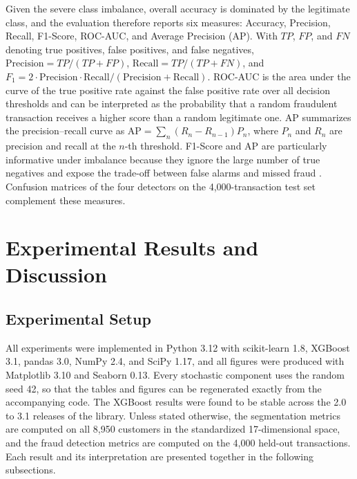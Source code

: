 \documentclass[conference]{IEEEtran}
\begin{document}
Given the severe class imbalance, overall accuracy is dominated by the legitimate class, and the evaluation therefore reports six measures: Accuracy, Precision, Recall, F1-Score, ROC-AUC, and Average Precision (AP). With $TP$, $FP$, and $FN$ denoting true positives, false positives, and false negatives, $\mathrm{Precision}=TP/(TP+FP)$, $\mathrm{Recall}=TP/(TP+FN)$, and $F_1=2\cdot\mathrm{Precision}\cdot\mathrm{Recall}/(\mathrm{Precision}+\mathrm{Recall})$. ROC-AUC is the area under the curve of the true positive rate against the false positive rate over all decision thresholds and can be interpreted as the probability that a random fraudulent transaction receives a higher score than a random legitimate one. AP summarizes the precision--recall curve as $\mathrm{AP}=\sum_{n}(R_n-R_{n-1})P_n$, where $P_n$ and $R_n$ are precision and recall at the $n$-th threshold. F1-Score and AP are particularly informative under imbalance because they ignore the large number of true negatives and expose the trade-off between false alarms and missed fraud \cite{saito2015precision}. Confusion matrices of the four detectors on the 4,000-transaction test set complement these measures.

\section{Experimental Results and Discussion}
\label{sec:results}

\subsection{Experimental Setup}

All experiments were implemented in Python 3.12 with scikit-learn 1.8, XGBoost 3.1, pandas 3.0, NumPy 2.4, and SciPy 1.17, and all figures were produced with Matplotlib 3.10 and Seaborn 0.13. Every stochastic component uses the random seed 42, so that the tables and figures can be regenerated exactly from the accompanying code. The XGBoost results were found to be stable across the 2.0 to 3.1 releases of the library. Unless stated otherwise, the segmentation metrics are computed on all 8,950 customers in the standardized 17-dimensional space, and the fraud detection metrics are computed on the 4,000 held-out transactions. Each result and its interpretation are presented together in the following subsections.
\end{document}
